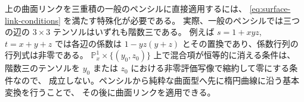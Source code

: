上の曲面リンクを三重積の一般のペンシルに直接適用するには、
\eqref{eq:surface-link-conditions} を満たす特殊化が必要である。
実際、一般のペンシルでは三つの辺の $3\times3$ テンソルはいずれも階数三である。
例えば $s=1+xyz$, $t=x+y+z$ では各辺の係数は
$1-yz(y+z)$ とその置換であり、係数行列の行列式は非零である。
$\mathbb P^1_x\times\{(y_0,z_0)\}$ 上で混合項が恒等的に消える条件は、
階数三のテンソルを $y_0$ または $z_0$ における非零評価写像で縮約して零にする条件なので、
成立しない。ペンシルから純粋な曲面型へ先に楕円曲線に沿う基本変換を行うことで、
その後に曲面リンクを適用できる。
